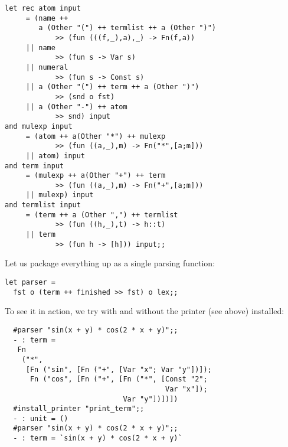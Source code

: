 \begin{slide*}


\begin{black}\begin{footnotesize}\begin{verbatim}
let rec atom input
     = (name ++
        a (Other "(") ++ termlist ++ a (Other ")")
            >> (fun (((f,_),a),_) -> Fn(f,a))
     || name
            >> (fun s -> Var s)
     || numeral
            >> (fun s -> Const s)
     || a (Other "(") ++ term ++ a (Other ")")
            >> (snd o fst)
     || a (Other "-") ++ atom
            >> snd) input
and mulexp input
     = (atom ++ a(Other "*") ++ mulexp
            >> (fun ((a,_),m) -> Fn("*",[a;m]))
     || atom) input
and term input
     = (mulexp ++ a(Other "+") ++ term
            >> (fun ((a,_),m) -> Fn("+",[a;m]))
     || mulexp) input
and termlist input
     = (term ++ a (Other ",") ++ termlist
            >> (fun ((h,_),t) -> h::t)
     || term
            >> (fun h -> [h])) input;;
\end{verbatim}\end{footnotesize}\end{black}

\end{slide*}



\begin{slide*}


\vspace*{0.5cm}

Let us package everything up as a single parsing function:

\begin{black}\begin{verbatim}
let parser =
  fst o (term ++ finished >> fst) o lex;;
\end{verbatim}\end{black}

\noindent To see it in action, we try with and without the printer (see above)
installed:

\begin{black}\begin{footnotesize}\begin{verbatim}
  #parser "sin(x + y) * cos(2 * x + y)";;
  - : term =
   Fn
    ("*",
     [Fn ("sin", [Fn ("+", [Var "x"; Var "y"])]);
      Fn ("cos", [Fn ("+", [Fn ("*", [Const "2";
                                      Var "x"]);
                            Var "y"])])])
  #install_printer "print_term";;
  - : unit = ()
  #parser "sin(x + y) * cos(2 * x + y)";;
  - : term = `sin(x + y) * cos(2 * x + y)`
\end{verbatim}\end{footnotesize}\end{black}

\end{slide*}



